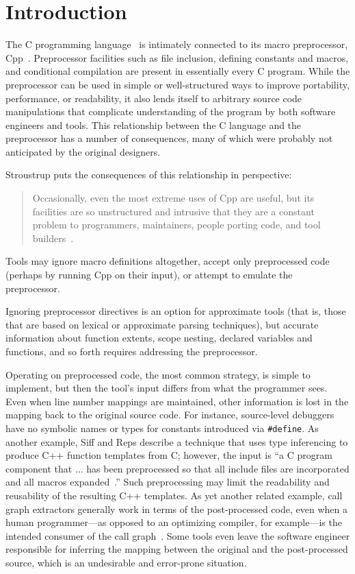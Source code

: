 \bigskip

\section{Introduction}

The C programming language~\cite{ansi} is intimately connected to its macro
preprocessor, Cpp~\cite[Ch.3]{Harbison91}.  Preprocessor facilities such as
file inclusion, defining constants and macros, and conditional compilation
are present in essentially every C program.   
While the preprocessor can be used in simple or well-structured ways to
improve portability, performance, or readability, it also lends itself to 
arbitrary source code manipulations that complicate understanding of the
program by both software engineers and tools.
This relationship
between the C language and the preprocessor has a number of consequences,
many of which were probably not anticipated by the original designers.

Stroustrup puts the consequences of this relationship in perspective:
\begin{quote}
Occasionally, even the most extreme uses of Cpp are useful, but its
facilities are so unstructured and intrusive that they are a constant
problem to programmers, maintainers, people porting code, and tool
builders~\cite[p.~424]{Stroustrup-DesignEvolution}.
\end{quote}

Tools may ignore macro definitions altogether, accept only preprocessed
code (perhaps by running Cpp on their input), or attempt to emulate the
preprocessor.

Ignoring preprocessor directives is an option for approximate tools
(that is, those that are based on lexical or approximate parsing
techniques), but accurate information about function extents, scope
nesting, declared variables and functions, and so forth requires
addressing the preprocessor.

Operating on preprocessed code, the most common strategy, is simple to
implement, but then the tool's input differs from what the
programmer sees.  Even when line number mappings are maintained, other
information is lost in the mapping back to the original source code.
For instance, source-level debuggers have no symbolic names or types
for constants introduced via \verb|#define|.  As another example, Siff
and Reps describe a technique that uses type inferencing to produce
C++ function templates from C; however, the input is ``a C program
component that $\ldots$ has been preprocessed so that all include
files are incorporated and all macros
expanded~\cite[p.~145]{Siff-fse96}.''  Such preprocessing may limit
the readability and reusability of the resulting C++ templates.  As
yet another related example, call graph extractors generally work in
terms of the post-processed code, even when a human programmer---as
opposed to an optimizing compiler, for example---is the intended
consumer of the call graph~\cite{Murphy-icse18}.  Some tools even
leave the software engineer responsible for inferring the mapping between the
original and the post-processed source, which is an undesirable and
error-prone situation.

